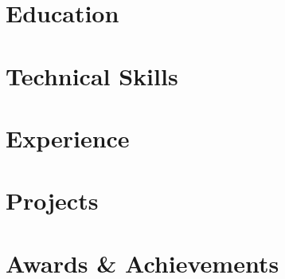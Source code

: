 \documentclass[a4paper,11pt]{article}
\begin{document}



\section{Education}


\section{Technical Skills}


\section{Experience}


\section{Projects}


\section{Awards \& Achievements}

\end{document}
